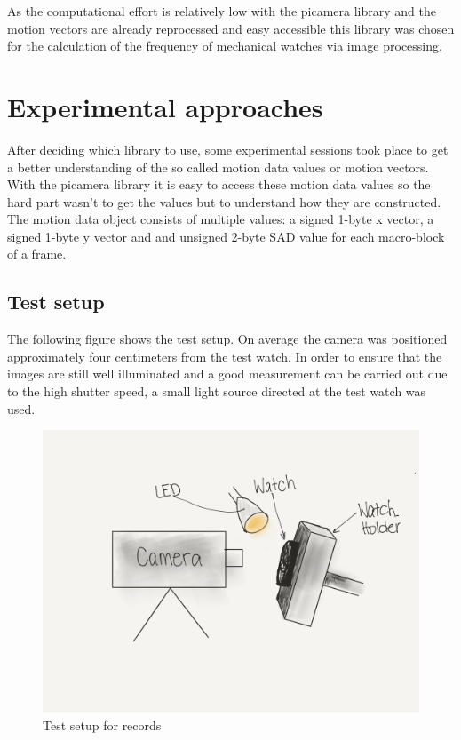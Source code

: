 \documentclass[12pt, a4paper]{report}
\begin{document}
    As the computational effort is relatively low with the picamera library and the motion vectors are already reprocessed and easy accessible this library was chosen for the calculation of the frequency of mechanical watches via image processing.

    \chapter {Experimental approaches}

    After deciding which library to use, some experimental sessions took place to get a better understanding of the so called motion data values or motion vectors. 
    With the picamera library it is easy to access these motion data values so the hard part wasn't to get the values but to understand how they are constructed. 
    The motion data object consists of multiple values: a signed 1-byte x vector, a signed 1-byte y vector and and unsigned 2-byte SAD value for each macro-block of a frame.
    
   \section{Test setup}
   
The following figure shows the test setup. On average the camera was positioned approximately four centimeters from the test watch. In order to ensure that the images are still well illuminated and a good measurement can be carried out due to the high shutter speed, a small light source directed at the test watch was used.

      \begin{figure}[H]
        \centering
        \includegraphics[scale=0.1]{Images/test_setup}
        
        \caption{Test setup for records}
        \end{figure}
        
\end{document}
